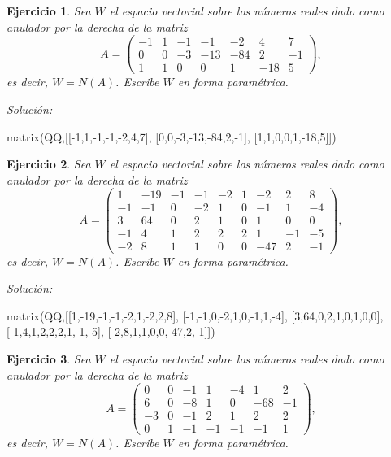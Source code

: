 \documentclass{amsart}
\newtheorem{ejer}{Ejercicio}
\begin{document}


\begin{ejer} Sea $W$ el espacio vectorial sobre los números reales dado
como anulador por la derecha de la matriz 
\[A = \left(\begin{array}{rrrrrrr}
-1 & 1 & -1 & -1 & -2 & 4 & 7 \\
0 & 0 & -3 & -13 & -84 & 2 & -1 \\
1 & 1 & 0 & 0 & 1 & -18 & 5
\end{array}\right),\]
es decir, $W = N(A)$. Escribe $W$ en forma param\'etrica.
\end{ejer}

{\it Soluci\'on:}

\begin{sageblock}
matrix(QQ,[[-1,1,-1,-1,-2,4,7],
[0,0,-3,-13,-84,2,-1],
[1,1,0,0,1,-18,5]])
\end{sageblock}



\begin{ejer} Sea $W$ el espacio vectorial sobre los números reales dado
como anulador por la derecha de la matriz 
\[A = \left(\begin{array}{rrrrrrrrr}
1 & -19 & -1 & -1 & -2 & 1 & -2 & 2 & 8 \\
-1 & -1 & 0 & -2 & 1 & 0 & -1 & 1 & -4 \\
3 & 64 & 0 & 2 & 1 & 0 & 1 & 0 & 0 \\
-1 & 4 & 1 & 2 & 2 & 2 & 1 & -1 & -5 \\
-2 & 8 & 1 & 1 & 0 & 0 & -47 & 2 & -1
\end{array}\right),\]
es decir, $W = N(A)$. Escribe $W$ en forma param\'etrica.
\end{ejer}

{\it Soluci\'on:}

\begin{sageblock}
matrix(QQ,[[1,-19,-1,-1,-2,1,-2,2,8],
[-1,-1,0,-2,1,0,-1,1,-4],
[3,64,0,2,1,0,1,0,0],
[-1,4,1,2,2,2,1,-1,-5],
[-2,8,1,1,0,0,-47,2,-1]])
\end{sageblock}



\begin{ejer} Sea $W$ el espacio vectorial sobre los números reales dado
como anulador por la derecha de la matriz 
\[A = \left(\begin{array}{rrrrrrr}
0 & 0 & -1 & 1 & -4 & 1 & 2 \\
6 & 0 & -8 & 1 & 0 & -68 & -1 \\
-3 & 0 & -1 & 2 & 1 & 2 & 2 \\
0 & 1 & -1 & -1 & -1 & -1 & 1
\end{array}\right),\]
es decir, $W = N(A)$. Escribe $W$ en forma param\'etrica.
\end{ejer}
\end{document}
